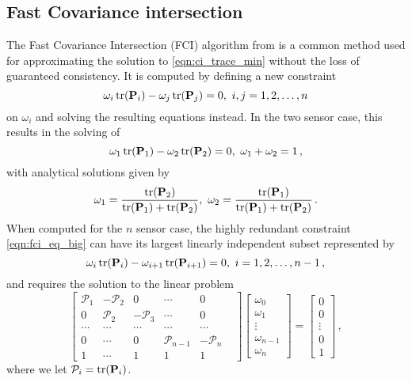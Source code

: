 \documentclass[letterpaper, 10 pt, conference]{ieeeconf}  %
\begin{document}
\subsection{Fast Covariance intersection}
The Fast Covariance Intersection (FCI) algorithm from \cite{niehsenInformationFusionBased2002} is a common method used for approximating the solution to \eqref{eqn:ci_trace_min} without the loss of guaranteed consistency. It is computed by defining a new constraint
\begin{equation}
   \omega_i \operatorname{tr}({{\mathbf{P}}}_i) - \omega_j \operatorname{tr}({{\mathbf{P}}}_j) = 0,\ i,j=1,2,\dots,n \label{eqn:fci_eq_big}
\end{equation}
on $\omega_i$ and solving the resulting equations instead. In the two sensor case, this results in the solving of
\begin{equation}
   \omega_1 \operatorname{tr}({{\mathbf{P}}}_1) - \omega_2 \operatorname{tr}({{\mathbf{P}}}_2) = 0,\ \omega_1 + \omega_2 = 1\,, \label{eqn:fci_2sen_omega_sum_eq}
\end{equation}
with analytical solutions given by
\begin{equation}
   \omega_1 = \frac{\operatorname{tr}({{\mathbf{P}}}_2)}{\operatorname{tr}({{\mathbf{P}}}_1)+\operatorname{tr}({{\mathbf{P}}}_2)},\ \omega_2 = \frac{\operatorname{tr}({{\mathbf{P}}}_1)}{\operatorname{tr}({{\mathbf{P}}}_1)+\operatorname{tr}({{\mathbf{P}}}_2)}\,. \label{eqn:fci_2sen_sol}
\end{equation}
When computed for the $n$ sensor case, the highly redundant constraint \eqref{eqn:fci_eq_big} can have its largest linearly independent subset represented by
\begin{equation}
   \omega_i \operatorname{tr}({{\mathbf{P}}}_i) - \omega_{i+1} \operatorname{tr}({{\mathbf{P}}}_{i+1}) = 0,\ i=1,2,\dots,n-1\,, \label{eqn:fci_eq}
\end{equation}
and requires the solution to the linear problem
\begin{equation}
   \begin{bmatrix}
      \mathcal{P}_1 & -\mathcal{P}_2 & 0 & \cdots & 0 \\
      0 & \mathcal{P}_2 & -\mathcal{P}_3 & \cdots & 0 \\
      \cdots & \cdots & \cdots & \cdots & \cdots & \\
      0 & \cdots & 0 & \mathcal{P}_{n-1} & -\mathcal{P}_{n} \\
      1 & \cdots & 1 & 1 & 1 &
   \end{bmatrix}
   \begin{bmatrix}
      \omega_0 \\
      \omega_1 \\
      \vdots \\
      \omega_{n-1} \\
      \omega_{n}
   \end{bmatrix}
   =
   \begin{bmatrix}
      0 \\
      0 \\
      \vdots \\
      0 \\
      1
   \end{bmatrix}\,, \label{eqn:fci_eq_sys}
\end{equation}
where we let $\mathcal{P}_i = \operatorname{tr}({{\mathbf{P}}}_i)$.
\end{document}
